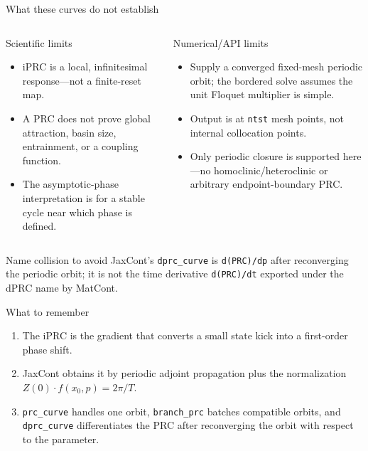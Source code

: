 \begin{frame}{What these curves do not establish}
\scriptsize
\begin{columns}[T,onlytextwidth]
\begin{alertblock}{Scientific limits}
\begin{itemize}
  \item iPRC is a local, infinitesimal response—not a finite-reset map.
  \item A PRC does not prove global attraction, basin size, entrainment, or a coupling function.
  \item The asymptotic-phase interpretation is for a stable cycle near which phase is defined.
\end{itemize}
\end{alertblock}
\begin{alertblock}{Numerical/API limits}
\begin{itemize}
  \item Supply a converged fixed-mesh periodic orbit; the bordered solve assumes the unit Floquet multiplier is simple.
  \item Output is at \texttt{ntst} mesh points, not internal collocation points.
  \item Only periodic closure is supported here—no homoclinic/heteroclinic or arbitrary endpoint-boundary PRC.
\end{itemize}
\end{alertblock}
\end{columns}
\vspace{2mm}
\begin{block}{Name collision to avoid}
JaxCont's \texttt{dprc\_curve} is \texttt{d(PRC)/dp} after reconverging the periodic orbit; it is not the time derivative \texttt{d(PRC)/dt} exported under the dPRC name by MatCont.
\end{block}
\end{frame}

\begin{frame}{What to remember}
\large
\begin{enumerate}
  \item The iPRC is the gradient that converts a small state kick into a first-order phase shift.
  \item JaxCont obtains it by periodic adjoint propagation plus the normalization $Z(0)\cdot f(x_0,p)=2\pi/T$.
  \item \texttt{prc\_curve} handles one orbit, \texttt{branch\_prc} batches compatible orbits, and \texttt{dprc\_curve} differentiates the PRC after reconverging the orbit with respect to the parameter.
\end{enumerate}
\vfill
\centering
\mainbadge
\end{frame}
